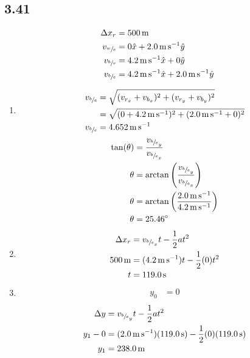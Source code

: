 \documentclass{article}
\begin{document}
\subsection{3.41}
\begin{align*}
	\Delta x_r & = \SI{500}{\meter} \\
	v_{\sfrac{w}{e}} & = 0\hat{x} + \SI{2.0}{\meter \per \second}\hat{y} \\
	v_{\sfrac{b}{r}} & = \SI{4.2}{\meter \per \second}\hat{x} + 0\hat{y} \\
	v_{\sfrac{b}{e}} & = \SI{4.2}{\meter \per \second}\hat{x} + \SI{2.0}{\meter \per \second}\hat{y}
\end{align*}
\begin{enumerate}[label=\textbf{(\alph*)}]
	\item
		\begin{align*}
			v_{\sfrac{b}{e}} & = \sqrt{(v_{r_x} + v_{b_x})^2 + (v_{r_y} + v_{b_y})^2} \\
			  & = \sqrt{(0 + \SI{4.2}{\meter \per \second})^2 + (\SI{2.0}{\meter \per \second} + 0)^2} \\
			v_{\sfrac{b}{e}} & = \SI{4.652}{\meter \per \second}
		\end{align*}
		\begin{align*}
			\tan(\theta) & = \frac{ v_{ \sfrac{b}{e}_y} }{ v_{\sfrac{b}{e}_x} } \\
			\theta & = \arctan \left( \frac{ v_{\sfrac{b}{e}_y} }{ v_{\sfrac{b}{e}_x} } \right) \\
			\theta & = \arctan \left( \frac{\SI{2.0}{\meter \per \second}}{\SI{4.2}{\meter \per \second}} \right) \\
			\theta & = \SI{25.46}{\degree}
		\end{align*}
	\item
		\begin{align*}
			\Delta x_r & = v_{\sfrac{b}{e}_x}t - \frac{1}{2}at^2 \\
			\SI{500}{\meter} & = (\SI{4.2}{\meter \per \second})t - \frac{1}{2}(0)t^2 \\
			t & = \SI{119.0}{\second}
		\end{align*}
	\item
		\begin{align*}
			y_0 & = 0
		\end{align*}
		\begin{align*}
			\Delta y & = v_{\sfrac{b}{e}_y}t - \frac{1}{2}at^2 \\
			y_1 - 0 & = (\SI{2.0}{\meter \per \second})(\SI{119.0}{\second}) - \frac{1}{2}(0)(\SI{119.0}{\second}) \\
			y_1 & = \SI{238.0}{\meter}
		\end{align*}
\end{enumerate}
\end{document}

